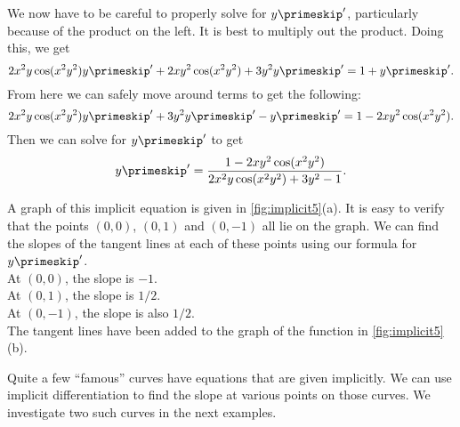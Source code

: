 \begin{example}
We now have to be careful to properly solve for $y\primeskip'$, particularly because of the product on the left.  It is best to multiply out the product.  Doing this, we get
\[2x^2y\cos(x^2y^2)y\primeskip' + 2xy^2\cos(x^2y^2) + 3y^2y\primeskip' = 1 + y\primeskip'.\]
From here we can safely move around terms to get the following:
\[2x^2y\cos(x^2y^2)y\primeskip' + 3y^2y\primeskip' - y\primeskip' = 1 - 2xy^2\cos(x^2y^2).\]
Then we can solve for $y\primeskip'$ to get
\[y\primeskip' = \frac{1 - 2xy^2\cos(x^2y^2)}{2x^2y\cos(x^2y^2)+3y^2-1}.\]

A graph of this implicit equation is given in \autoref{fig:implicit5}(a). It is easy to verify that the points $(0,0)$, $(0,1)$ and $(0,-1)$ all lie on the graph. We can find the slopes of the tangent lines at each of these points using our formula for $y\primeskip'$.\\
At $(0,0)$, the slope is $-1$.\\
At $(0,1)$, the slope is $1/2$.\\
At $(0,-1)$, the slope is also $1/2$.\\
The tangent lines have been added to the graph of the function in \autoref{fig:implicit5}(b).
\end{example}

Quite a few ``famous'' curves have equations that are given implicitly.  We can use implicit differentiation to find the slope at various points on those curves. We investigate two such curves in the next examples.\bigskip

